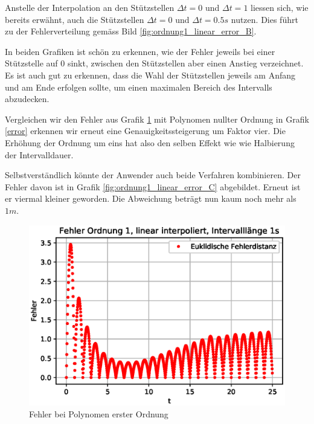 Anstelle der Interpolation an den Stützstellen $\Delta t = 0$ und $\Delta t = 1$ liessen sich, wie bereits erwähnt, auch die Stützstellen $\Delta t = 0$ und $\Delta t = 0.5s$ nutzen. Dies führt zu der Fehlerverteilung gemäss Bild \ref{fig:ordnung1_linear_error_B}.

In beiden Grafiken ist schön zu erkennen, wie der Fehler jeweils bei einer Stützstelle auf $0$ sinkt, zwischen den Stützstellen aber einen Anstieg verzeichnet. Es ist auch gut zu erkennen, dass die Wahl der Stützstellen jeweils am Anfang und am Ende erfolgen sollte, um einen maximalen Bereich des Intervalls abzudecken. 

Vergleichen wir den Fehler aus Grafik \ref{fig:ordnung1_linear_error_A} mit Polynomen nullter Ordnung in Grafik \ref{error} erkennen wir erneut eine Genauigkeitssteigerung um Faktor vier. Die Erhöhung der Ordnung um eins hat also den selben Effekt wie wie Halbierung der Intervalldauer.

Selbstverständlich könnte der Anwender auch beide Verfahren kombinieren. Der Fehler davon ist in Grafik \ref{fig:ordnung1_linear_error_C} abgebildet. Erneut ist er viermal kleiner geworden. Die Abweichung beträgt nun kaum noch mehr als $1m$.

\begin{figure}
	\centering
	\includegraphics[scale=0.7]{papers/perturbation/bilder/perturbation_fig6.eps}
	\caption{Fehler bei Polynomen erster Ordnung}
	\label{fig:ordnung1_linear_error_A}
\end{figure}

